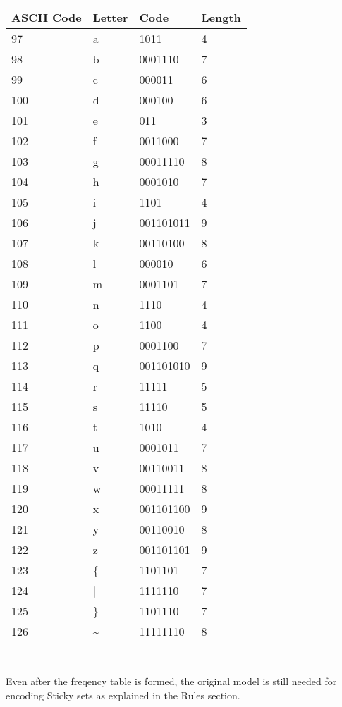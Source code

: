 \documentclass[]{article}
\begin{document}
\begin{center}
\begin{tabular}{ | l | l | l | l |} \hline
﻿\textbf{ASCII Code} & ﻿\textbf{Letter} & ﻿\textbf{Code} & ﻿\textbf{Length} \\ \hline
	97 & a & 1011 & 4 \\ \hline
	98 & b & 0001110 & 7 \\ \hline
	99 & c & 000011 & 6 \\ \hline
	100 & d & 000100 & 6 \\ \hline
	101 & e & 011 & 3 \\ \hline
	102 & f & 0011000 & 7 \\ \hline
	103 & g & 00011110 & 8 \\ \hline
	104 & h & 0001010 & 7 \\ \hline
	105 & i & 1101 & 4 \\ \hline
	106 & j & 001101011 & 9 \\ \hline
	107 & k & 00110100 & 8 \\ \hline
	108 & l & 000010 & 6 \\ \hline
	109 & m & 0001101 & 7 \\ \hline
	110 & n & 1110 & 4 \\ \hline
	111 & o & 1100 & 4 \\ \hline
	112 & p & 0001100 & 7 \\ \hline
	113 & q & 001101010 & 9 \\ \hline
	114 & r & 11111 & 5 \\ \hline
	115 & s & 11110 & 5 \\ \hline
	116 & t & 1010 & 4 \\ \hline
	117 & u & 0001011 & 7 \\ \hline
	118 & v & 00110011 & 8 \\ \hline
	119 & w & 00011111 & 8 \\ \hline
	120 & x & 001101100 & 9 \\ \hline
	121 & y & 00110010 & 8 \\ \hline
	122 & z & 001101101 & 9 \\ \hline
	123 & \{ & 1101101 & 7 \\ \hline
	124 & | & 1111110 & 7 \\ \hline
	125 & \} & 1101110 & 7 \\ \hline
	126 & \~{} & 11111110 & 8 \\ \hline
	﻿\end{tabular}
\end{center}

Even after the freqency table is formed, the original model is still needed for encoding Sticky sets as explained in the Rules section.
\end{document}
